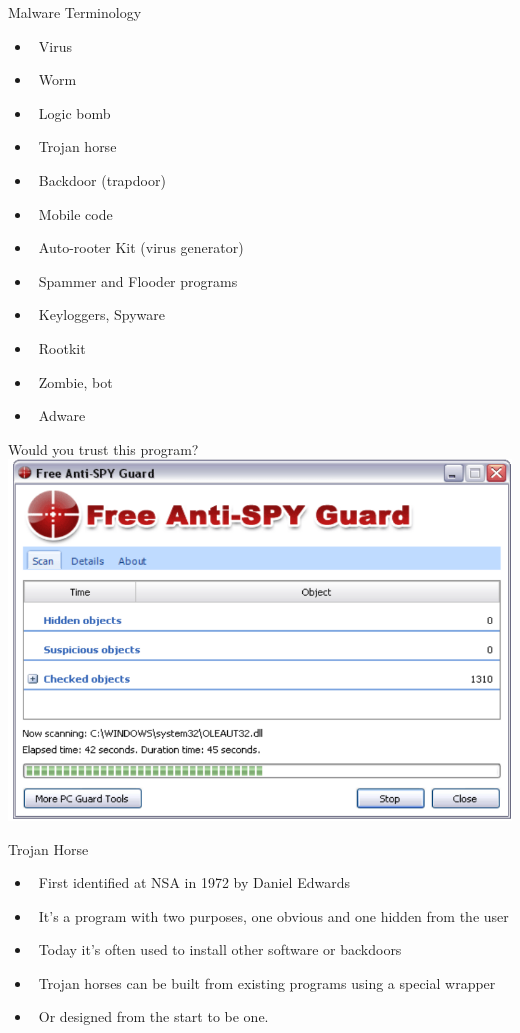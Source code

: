 \documentclass{beamer}
\begin{document}
\begin{frame}{Malware Terminology}
  \begin{itemize}
  \item  Virus 
  \item  Worm 
  \item  Logic bomb 
  \item  Trojan horse 
  \item  Backdoor (trapdoor)‏ 
  \item  Mobile code 
  \item  Auto-rooter Kit (virus generator)‏ 
  \item  Spammer and Flooder programs 
  \item  Keyloggers, Spyware 
  \item  Rootkit 
  \item  Zombie, bot 
  \item  Adware   
  \end{itemize}
\end{frame}
 

\begin{frame}{Would you trust this program?}
  \includegraphics[width=0.8\linewidth]{freeantispy}
\end{frame}

\begin{frame}{Trojan Horse}
  \begin{itemize}
  \item  First identified at NSA in 1972 by Daniel 
    Edwards 
  \item  It's a program with two purposes, one obvious 
    and one hidden from the user 
  \item  Today it's often used to install other software or 
    backdoors 
  \item  Trojan horses can be built from existing 
    programs using a special wrapper 
  \item  Or designed from the start to be one.
  \end{itemize}
\end{frame}
\end{document}
